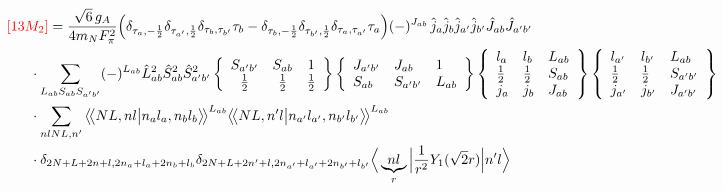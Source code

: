 \documentclass[master]{shnuthesis}
\newcommand{\llangle}{\big\langle\!\big\langle}
\newcommand{\rrangle}{\big\rangle\!\big\rangle}
\newcommand{\ap}{a^\prime}
\newcommand{\bp}{b^\prime}
\newcommand{\il}{\!\!\!\!\!\!\!\!\!\!}
\begin{document}
\begin{align}
    &\il {\color{red} [13M_2]} = \frac{\sqrt{6}\,g_A}{4m_N F_\pi^2} \Big( \delta_{\tau_a,-\frac{1}{2}}\delta_{\tau_{\ap},\frac{1}{2}}\delta_{\tau_b,\tau_{\bp}}\tau_b - \delta_{\tau_b,-\frac{1}{2}}\delta_{\tau_{\bp},\frac{1}{2}}\delta_{\tau_a,\tau_{\ap}}\tau_a \Big) (-)^{J_{ab}}\,\hat{j}_a\hat{j}_b\hat{j}_{\ap}\hat{j}_{\bp}\hat{J}_{ab}\hat{J}_{\ap\bp}  \notag\\
    & \cdot \sum_{L_{ab}S_{ab}S_{\ap\bp}} (-)^{L_{ab}} \hat{L}_{ab}^2\hat{S}_{ab}^2\hat{S}_{\ap\bp}^2  \left\{\begin{array}{ccc} S_{\ap\bp} & S_{ab} & 1 \\ \frac{1}{2} & \frac{1}{2} & \frac{1}{2} \end{array}\right\}  \left\{\begin{array}{lll} J_{\ap\bp} & J_{ab} & 1 \\ S_{ab} & S_{\ap\bp} & L_{ab} \end{array}\right\}  \left\{\begin{array}{lll}l_{a} & l_{b} & L_{ab} \\ \frac{1}{2} & \frac{1}{2} & S_{ab} \\j_{a} & j_{b} & J_{ab} \end{array}\right\} \left\{\begin{array}{lll} l_{\ap} & l_{\bp} & L_{ab} \\ \frac{1}{2} & \frac{1}{2} & S_{\ap\bp} \\j_{\ap} & j_{\bp} & J_{\ap\bp} \end{array}\right\}  \notag \\
    & \cdot \sum_{nlNL,n^\prime} \llangle N L, n l \big| n_{a} l_{a}, n_{b} l_{b} \rrangle^{L_{ab}} \llangle N L, n^\prime l \big| n_{a^\prime} l_{a^\prime}, n_{b^\prime} l_{b^\prime} \rrangle^{L_{ab}} \notag\\
    & \cdot \delta_{2N+L+2n+l,2n_a+l_a+2n_b+l_b}\delta_{2N+L+2n^\prime+l,2n_{a^\prime}+l_{a^\prime}+2n_{b^\prime}+l_{b^\prime}} \Big\langle \underbrace{n l}_{r} \Big| \frac{1}{r^2}Y_1(\sqrt{2}r) \Big| n^\prime l \Big\rangle
\end{align}



\end{document}
